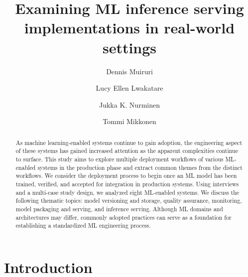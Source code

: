 \documentclass[manuscript,screen,review]{acmart}
\begin{document}
\graphicspath{ {./images/} }


\title{Examining ML inference serving implementations in real-world settings} %

\author{Dennis Muiruri}
\author{Lucy Ellen Lwakatare}
\author{Jukka K. Nurminen}

\author{Tommi Mikkonen}


\begin{abstract}
As machine learning-enabled systems continue to gain adoption, the engineering aspect of these systems has gained increased attention as the apparent complexities continue to surface.
This study aims to explore multiple deployment workflows of various ML-enabled systems in the production phase and extract common themes from the distinct workflows. We consider the deployment process to begin once an ML model has been trained, verified, and accepted for integration in production systems.
Using interviews and a multi-case study design, we analyzed eight ML-enabled systems.
We discuss the following thematic topics: model versioning and storage, quality assurance, monitoring, model packaging and serving, and inference serving.
Although ML domains and architectures may differ, commonly adopted practices can serve as a foundation for establishing a standardized ML engineering process.

\end{abstract}

\maketitle


\section{Introduction}
\label{sec: introduction}

\end{document}
